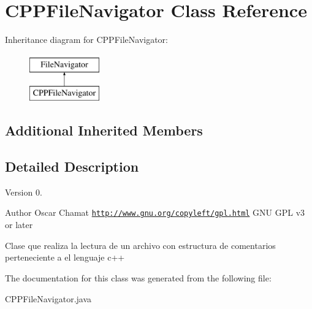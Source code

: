 \hypertarget{classCPPFileNavigator}{\section{C\-P\-P\-File\-Navigator Class Reference}
\label{classCPPFileNavigator}
}
Inheritance diagram for C\-P\-P\-File\-Navigator\-:\begin{figure}[H]
\begin{center}
\leavevmode
\includegraphics[height=2.000000cm]{classCPPFileNavigator}
\end{center}
\end{figure}
\subsection*{Additional Inherited Members}


\subsection{Detailed Description}
\begin{DoxyVersion}{Version}
0. 
\end{DoxyVersion}
\begin{DoxyAuthor}{Author}
Oscar Chamat  \href{http://www.gnu.org/copyleft/gpl.html}{\tt http\-://www.\-gnu.\-org/copyleft/gpl.\-html} G\-N\-U G\-P\-L v3 or later
\end{DoxyAuthor}
Clase que realiza la lectura de un archivo con estructura de comentarios perteneciente a el lenguaje c++ 

The documentation for this class was generated from the following file\-:\begin{DoxyCompactItemize}
\item 
C\-P\-P\-File\-Navigator.\-java\end{DoxyCompactItemize}
